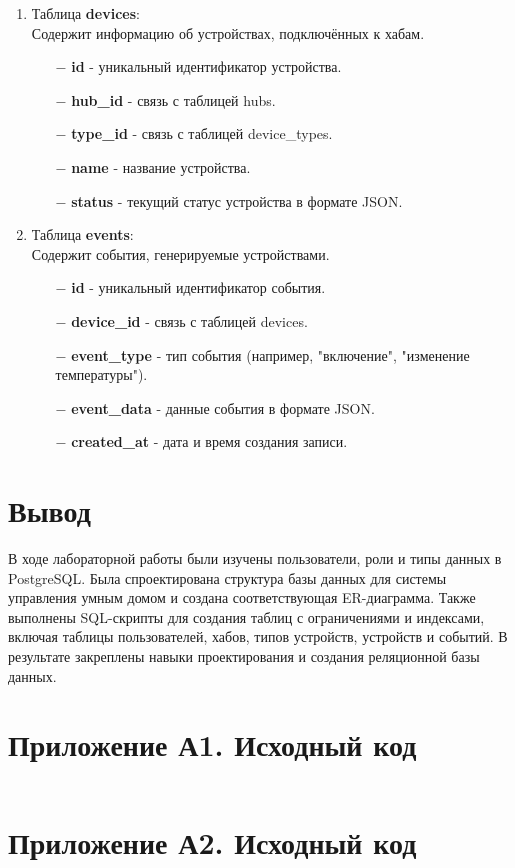 \documentclass[oneside,a4paper,14pt]{extarticle}
\begin{document}
\begin{enumerate}
  \item Таблица \textbf{devices}:\\
        Содержит информацию об устройствах, подключённых к хабам.
        \begin{itemize}
          \item[$-$] \textbf{id} - уникальный идентификатор устройства.
          \item[$-$] \textbf{hub\_id} - связь с таблицей hubs.
          \item[$-$] \textbf{type\_id} - связь с таблицей device\_types.
          \item[$-$] \textbf{name} - название устройства.
          \item[$-$] \textbf{status} - текущий статус устройства в формате JSON.
        \end{itemize}

  \item Таблица \textbf{events}:\\
        Содержит события, генерируемые устройствами.
        \begin{itemize}
          \item[$-$] \textbf{id} - уникальный идентификатор события.
          \item[$-$] \textbf{device\_id} - связь с таблицей devices.
          \item[$-$] \textbf{event\_type} - тип события (например, "включение", "изменение температуры").
          \item[$-$] \textbf{event\_data} - данные события в формате JSON.
          \item[$-$] \textbf{created\_at} - дата и время создания записи.
        \end{itemize}
\end{enumerate}


\section*{Вывод}

В ходе лабораторной работы были изучены пользователи, роли и типы данных в PostgreSQL. Была спроектирована структура базы данных для системы управления умным домом и создана соответствующая ER-диаграмма. Также выполнены SQL-скрипты для создания таблиц с ограничениями и индексами, включая таблицы пользователей, хабов, типов устройств, устройств и событий. В результате закреплены навыки проектирования и создания реляционной базы данных.
\newpage

\section*{Приложение А1. Исходный код}
\inputminted{Dockerfile}{../Containerfile}

\section*{Приложение А2. Исходный код}
\inputminted{sql}{code/init.sql}
\end{document}
